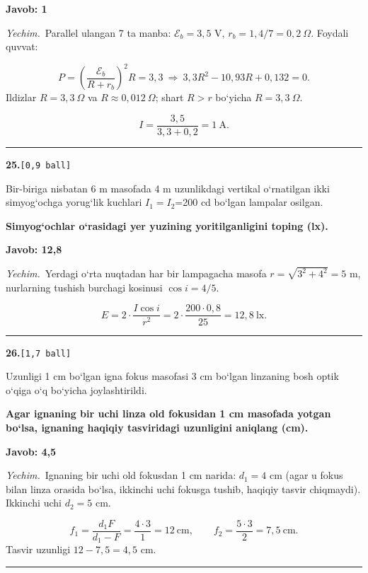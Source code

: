 \documentclass[11pt,a4paper]{article}
\newcommand{\ball}[1]{\hfill\texttt{[#1 ball]}}
\newcommand{\qhead}[2]{\Needspace{10\baselineskip}\noindent\textbf{#1.}\ball{#2}\par\nopagebreak}
\newenvironment{qbody}{\begin{list}{}{\leftmargin=8mm\rightmargin=0pt\topsep=0pt\itemsep=0pt\parsep=3pt}\item\relax}{\end{list}}
\begin{document}
\noindent\colorbox{gray!12}{\parbox{\dimexpr\linewidth-2\fboxsep}{\textbf{Javob: 1}}}\par\smallskip
\noindent\textit{Yechim.}\ Parallel ulangan 7 ta manba: $\mathcal E_b=3{,}5$ V, $r_b=1{,}4/7=0{,}2\ \Omega$. Foydali quvvat:\par
\[P=\left(\frac{\mathcal E_b}{R+r_b}\right)^2R=3{,}3\ \Rightarrow\ 3{,}3R^2-10{,}93R+0{,}132=0.\]
Ildizlar $R=3{,}3\ \Omega$ va $R\approx0{,}012\ \Omega$; shart $R>r$ bo‘yicha $R=3{,}3\ \Omega$.\par
\[I=\frac{3{,}5}{3{,}3+0{,}2}=1\ \text{A}.\]\par\medskip\hrule\medskip
\qhead{25}{0,9}
\begin{qbody}
Bir-biriga nisbatan 6 m masofada 4 m uzunlikdagi vertikal o‘rnatilgan ikki simyog‘ochga yorug‘lik kuchlari $I_1=I_2$=200 cd bo‘lgan lampalar osilgan.\par
\textbf{Simyog‘ochlar o‘rasidagi yer yuzining yoritilganligini toping (lx).}\par
\end{qbody}
\noindent\colorbox{gray!12}{\parbox{\dimexpr\linewidth-2\fboxsep}{\textbf{Javob: 12,8}}}\par\smallskip
\noindent\textit{Yechim.}\ Yerdagi o‘rta nuqtadan har bir lampagacha masofa $r=\sqrt{3^2+4^2}=5$ m, nurlarning tushish burchagi kosinusi $\cos i=4/5$.\par
\[E=2\cdot\frac{I\cos i}{r^2}=2\cdot\frac{200\cdot0{,}8}{25}=12{,}8\ \text{lx}.\]\par\medskip\hrule\medskip
\qhead{26}{1,7}
\begin{qbody}
Uzunligi 1 cm bo‘lgan igna fokus masofasi 3 cm bo‘lgan linzaning bosh optik o‘qiga o‘q bo‘yicha joylashtirildi.\par
\textbf{Agar ignaning bir uchi linza old fokusidan 1 cm masofada yotgan bo‘lsa, ignaning haqiqiy tasviridagi uzunligini aniqlang (cm).}\par
\end{qbody}
\noindent\colorbox{gray!12}{\parbox{\dimexpr\linewidth-2\fboxsep}{\textbf{Javob: 4,5}}}\par\smallskip
\noindent\textit{Yechim.}\ Ignaning bir uchi old fokusdan 1 cm narida: $d_1=4$ cm (agar u fokus bilan linza orasida bo‘lsa, ikkinchi uchi fokusga tushib, haqiqiy tasvir chiqmaydi). Ikkinchi uchi $d_2=5$ cm.\par
\[f_1=\frac{d_1F}{d_1-F}=\frac{4\cdot3}{1}=12\ \text{cm},\qquad f_2=\frac{5\cdot3}{2}=7{,}5\ \text{cm}.\]
Tasvir uzunligi $12-7{,}5=4{,}5$ cm.\par\par\medskip\hrule\medskip
\end{document}
